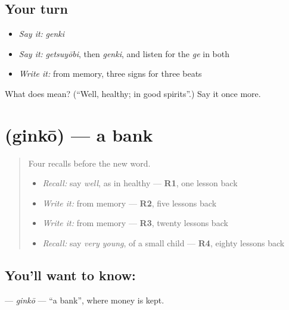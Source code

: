\subsection*{Your turn}
\begin{itemize}
\raggedright
  \item \emph{Say it:} \emph{genki}
  \item \emph{Say it:} \emph{getsuyōbi}, then \emph{genki}, and listen for the \emph{ge} in both
  \item \emph{Write it:} \textbf{} from memory, three signs for three beats
\end{itemize}

\begin{tcolorbox}[breakable,colback=teal!4,colframe=teal!35!black,title={Before you move on}]
What does  mean? (\textquotedblleft{}Well, healthy; in good spirits\textquotedblright{}.) Say it once more.
\end{tcolorbox}
\section[\texorpdfstring{\ja{ぎんこう} (ginkō)}{ぎんこう (ginkō)}]{ (ginkō) — a bank}

\label{lesson:JA-C135-ginkou}



\begin{quote}
Four recalls before the new word.

\begin{itemize}
\raggedright
  \item \emph{Recall:} say \emph{well}, as in healthy — \textbf{R1}, one lesson back
  \item \emph{Write it:} \textbf{} from memory — \textbf{R2}, five lessons back
  \item \emph{Write it:} \textbf{} from memory — \textbf{R3}, twenty lessons back
  \item \emph{Recall:} say \emph{very young}, of a small child — \textbf{R4}, eighty lessons back
\end{itemize}
\end{quote}

\subsection*{You'll want to know: }
\textbf{} — \emph{ginkō} — \textquotedblleft{}a bank\textquotedblright{}, where money is kept.


